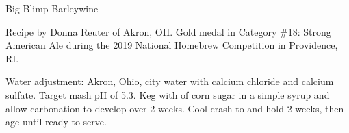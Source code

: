 \stylesection{\styleamericanbarleywine}

\begin{recipe}{Big Blimp Barleywine}

\begin{aboutblock}
Recipe by Donna Reuter of Akron, OH. Gold medal in Category \#18: Strong American
Ale during the 2019 National Homebrew Competition in Providence, RI. \sourceaha
\end{aboutblock}


\begin{methodandtiming}
 
\begin{mashsteps}
\end{mashsteps}

\begin{fermentationsteps}

\end{fermentationsteps}

\begin{directions}
Water adjustment: Akron, Ohio, city water with  calcium chloride and
 calcium sulfate. Target mash pH of 5.3. Keg with 
of corn sugar in a simple syrup and allow carbonation to develop over 2 weeks.
Cool crash to  and hold 2 weeks, then age until ready to serve.
\end{directions}

\end{methodandtiming}

\recipebreak

\begin{ingredientsblock}

\begin{malts}
\end{malts}

\begin{hops}
\end{hops}


\end{ingredientsblock}

\end{recipe}
